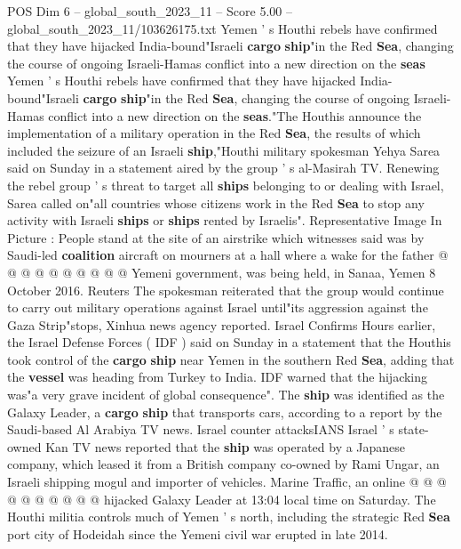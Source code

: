 \begin{textsample}{POS Dim 6 – global\_south\_2023\_11 – Score 5.00 – global\_south\_2023\_11/103626175.txt}  \label{ex:f6_pos_308}
Yemen ' s Houthi rebels have confirmed that they have hijacked India-bound"Israeli \textbf{cargo} \textbf{ship}"in the Red \textbf{Sea}, changing the course of ongoing Israeli-Hamas conflict into a new direction on the \textbf{seas} Yemen ' s Houthi rebels have confirmed that they have hijacked India-bound"Israeli \textbf{cargo} \textbf{ship}"in the Red \textbf{Sea}, changing the course of ongoing Israeli-Hamas conflict into a new direction on the \textbf{seas}."The Houthis announce the implementation of a military operation in the Red \textbf{Sea}, the results of which included the seizure of an Israeli \textbf{ship},"Houthi military spokesman Yehya Sarea said on Sunday in a statement aired by the group ' s al-Masirah TV.
Renewing the rebel group ' s threat to target all \textbf{ships} belonging to or dealing with Israel, Sarea called on"all countries whose citizens work in the Red \textbf{Sea} to stop any activity with Israeli \textbf{ships} or \textbf{ships} rented by Israelis".
Representative Image In Picture : People stand at the site of an airstrike which witnesses said was by Saudi-led \textbf{coalition} aircraft on mourners at a hall where a wake for the father @ @ @ @ @ @ @ @ @ @ Yemeni government, was being held, in Sanaa, Yemen 8 October 2016.
Reuters The spokesman reiterated that the group would continue to carry out military operations against Israel until"its aggression against the Gaza Strip"stops, Xinhua news agency reported.
Israel Confirms Hours earlier, the Israel Defense Forces ( IDF ) said on Sunday in a statement that the Houthis took control of the \textbf{cargo} \textbf{ship} near Yemen in the southern Red \textbf{Sea}, adding that the \textbf{vessel} was heading from Turkey to India.
IDF warned that the hijacking was"a very grave incident of global consequence".
The \textbf{ship} was identified as the Galaxy Leader, a \textbf{cargo} \textbf{ship} that transports cars, according to a report by the Saudi-based Al Arabiya TV news.
Israel counter attacksIANS Israel ' s state-owned Kan TV news reported that the \textbf{ship} was operated by a Japanese company, which leased it from a British company co-owned by Rami Ungar, an Israeli shipping mogul and importer of vehicles.
Marine Traffic, an online @ @ @ @ @ @ @ @ @ @ hijacked Galaxy Leader at 13:04 local time on Saturday.
The Houthi militia controls much of Yemen ' s north, including the strategic Red \textbf{Sea} port city of Hodeidah since the Yemeni civil war erupted in late 2014.

\end{textsample}
